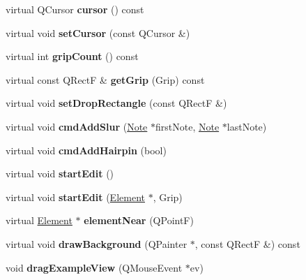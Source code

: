 \begin{DoxyCompactItemize}
\item 
\mbox{\label{class_ms_1_1_example_view_aeb6d951d59f9b7e2d40bbe158b880d53}} 
virtual Q\+Cursor {\bfseries cursor} () const
\item 
\mbox{\label{class_ms_1_1_example_view_aa7e70c32abb55a1ccb7794fe691b531c}} 
virtual void {\bfseries set\+Cursor} (const Q\+Cursor \&)
\item 
\mbox{\label{class_ms_1_1_example_view_ab37065ea7018cb04610ff55e95d078b4}} 
virtual int {\bfseries grip\+Count} () const
\item 
\mbox{\label{class_ms_1_1_example_view_a35f1cfd02b2937697431047b37621ba6}} 
virtual const Q\+RectF \& {\bfseries get\+Grip} (Grip) const
\item 
\mbox{\label{class_ms_1_1_example_view_af5676cf510243265048bcfcdbde275ca}} 
virtual void {\bfseries set\+Drop\+Rectangle} (const Q\+RectF \&)
\item 
\mbox{\label{class_ms_1_1_example_view_af65e2171c8f7d0d55b4ca085cd6e6eed}} 
virtual void {\bfseries cmd\+Add\+Slur} (\hyperlink{class_ms_1_1_note}{Note} $\ast$first\+Note, \hyperlink{class_ms_1_1_note}{Note} $\ast$last\+Note)
\item 
\mbox{\label{class_ms_1_1_example_view_a0ff8515c05f381a90f95bb629f234074}} 
virtual void {\bfseries cmd\+Add\+Hairpin} (bool)
\item 
\mbox{\label{class_ms_1_1_example_view_ad19ffc3c7b2881a0f95cdbb6a9a2d61e}} 
virtual void {\bfseries start\+Edit} ()
\item 
\mbox{\label{class_ms_1_1_example_view_aa89daa0c6582ec1150b49f46b83f31cb}} 
virtual void {\bfseries start\+Edit} (\hyperlink{class_ms_1_1_element}{Element} $\ast$, Grip)
\item 
\mbox{\label{class_ms_1_1_example_view_af01463989013c8bc2be9ab30a2b87bfb}} 
virtual \hyperlink{class_ms_1_1_element}{Element} $\ast$ {\bfseries element\+Near} (Q\+PointF)
\item 
\mbox{\label{class_ms_1_1_example_view_a289567f81d82d9fb80e82410a9b45697}} 
virtual void {\bfseries draw\+Background} (Q\+Painter $\ast$, const Q\+RectF \&) const
\item 
\mbox{\label{class_ms_1_1_example_view_a399550e242605e3eebd5f7418a9e7a7c}} 
void {\bfseries drag\+Example\+View} (Q\+Mouse\+Event $\ast$ev)
\end{DoxyCompactItemize}
